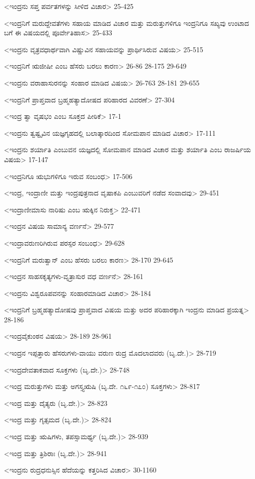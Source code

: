 <ಇಂದ್ರನು ಸಪ್ತ ಪರ್ವತಗಳನ್ನು ಸೀಳಿದ ವಿಚಾರ>
25-425

<ಇಂದ್ರನಿಗೆ ಮರುದ್ದೇವತೆಗಳು ಸಹಾಯ ಮಾಡಿದ ವಿಚಾರ ಮತ್ತು ಮರುತ್ತುಗಳಿಗೂ ಇಂದ್ರನಿಗೂ ಸಖ್ಯವು ಉಂಟಾದ ಬಗೆ ಈ ವಿಷಯದಲ್ಲಿ ಪೂರ್ವೇತಿಹಾಸ>
25-433

<ಇಂದ್ರನು ವೃತ್ರವಧಾರ್ಥವಾಗಿ ವಿಷ್ಣುವಿನ ಸಹಾಯವನ್ನು ಪ್ರಾರ್ಥಿಸಿರುವ ವಿಷಯ>
25-515

<ಇಂದ್ರನಿಗೆ ಋಜೀಷೀ ಎಂಬ ಹೆಸರು ಬರಲು ಕಾರಣ>
26-86 
28-175
29-649

<ಇಂದ್ರನು ವರಾಹಾಸುರನನ್ನು ಸಂಹಾರ ಮಾಡಿದ ವಿಷಯ>
26-763 
28-181
29-655

<ಇಂದ್ರನಿಗೆ ಪ್ರಾಪ್ತವಾದ ಬ್ರಹ್ಮಹತ್ಯಾದೋಷದ ಪರಿಹಾರದ ವಿವರಣೆ>
27-304

<ಇಂದ್ರ ತ್ವಾ ವೃಷಭಂ ಎಂಬ ಸೂಕ್ತದ ಪೀಠಿಕೆ>
17-1

<ಇಂದ್ರನು ತ್ವಷ್ಟೃವಿನ ಯಜ್ಞಗೃಹದಲ್ಲಿ ಬಲಾತ್ಕಾರದಿಂದ ಸೋಮಪಾನ ಮಾಡಿದ ವಿಚಾರ>
17-111

<ಇಂದ್ರನು ಶರ್ಯಾತಿ ಎಂಬುವನ ಯಜ್ಞದಲ್ಲಿ ಸೋಮಪಾನ ಮಾಡಿದ ವಿಚಾರ ಮತ್ತು ಶರ್ಯಾತಿ ಎಂಬ ರಾಜರ್ಷಿಯ ವಿಷಯ>
17-147

<ಇಂದ್ರನಿಗೂ ಋಭುಗಳಿಗೂ ಇರುವ ಸಂಬಂಧ>
17-506

<ಇಂದ್ರ, ಇಂದ್ರಾಣೀ ಮತ್ತು ಇಂದ್ರಪುತ್ರನಾದ ವೃಷಾಕಪಿ ಎಂಬುವರಿಗೆ ನಡೆದ ಸಂವಾದವು>
29-451

<ಇಂದ್ರಾಣೀಮಾಸು ನಾರಿಷು ಎಂಬ ಋಕ್ಕಿನ ನಿರುಕ್ತ>
22-471

<ಇಂದ್ರನ ವಿಷಯ ಸಾಮಾನ್ಯ ವರ್ಣನೆ>
29-577

<ಇಂದ್ರಾವರುಣರಿಗಿರುವ ಪರಸ್ಪರ ಸಂಬಂಧ>
29-628

<ಇಂದ್ರನಿಗೆ ಮರುತ್ವಾನ್‍ ಎಂಬ ಹೆಸರು ಬರಲು ಕಾರಣ>
28-170
29-645

<ಇಂದ್ರನ ಸಾಹಸಕೃತ್ಯಗಳು-ವೃತ್ರಾಸುರ ವಧ ವರ್ಣನೆ>
28-161

<ಇಂದ್ರನು ವಿಶ್ವರೂಪವನನ್ನು ಸಂಹಾರಮಾಡಿದ ವಿಚಾರ>
28-184

<ಇಂದ್ರನಿಗೆ ಬ್ರಹ್ಮಹತ್ಯಾದೋಷವು ಪ್ರಾಪ್ತವಾದ ವಿಷಯ ಮತ್ತು ಅದರ ಪರಿಹಾರಕ್ಕಾಗಿ ಇಂದ್ರನು ಮಾಡಿದ ಪ್ರಯತ್ನ>
28-186

<ಇಂದ್ರವೈಕುಂಠನ ವಿಷಯ>
28-189
28-961

<ಇಂದ್ರನ ಇಪ್ಪತ್ತಾರು ಹೆಸರುಗಳು-ವಾಯು ವರುಣ ರುದ್ರ ಮೊದಲಾದವರು (ಬೃ.ದೇ.)>
28-719

<ಇಂದ್ರದೇವತಾಕವಾದ ಸೂಕ್ತಗಳು (ಬೃ.ದೇ.)>
28-748

<ಇಂದ್ರ ಮರುತ್ತುಗಳು ಮತ್ತು ಅಗಸ್ತ್ಯಋಷಿ (ಬೃ.ದೇ. ೧೬೯-೧೭೦) ಸೂಕ್ತಗಳು>
28-817

<ಇಂದ್ರ ಮತ್ತು ದೈತ್ಯರು (ಬೃ.ದೇ.)>
28-823

<ಇಂದ್ರ ಮತ್ತು ಗೃತ್ಸಮದ (ಬೃ.ದೇ.)>
28-824

<ಇಂದ್ರ ಮತ್ತು ಋಷಿಗಳು, ತಪಸ್ಸಾಮರ್ಥ್ಯ (ಬೃ.ದೇ.)>
28-939

<ಇಂದ್ರ ಮತ್ತು ತ್ರಿಶಿರಾಃ (ಬೃ.ದೇ.)>
28-941

<ಇಂದ್ರನು ರುದ್ರಧನುಸ್ಸಿನ ಹೆದೆಯನ್ನು ಕತ್ತರಿಸಿದ ವಿಚಾರ>
30-1160

